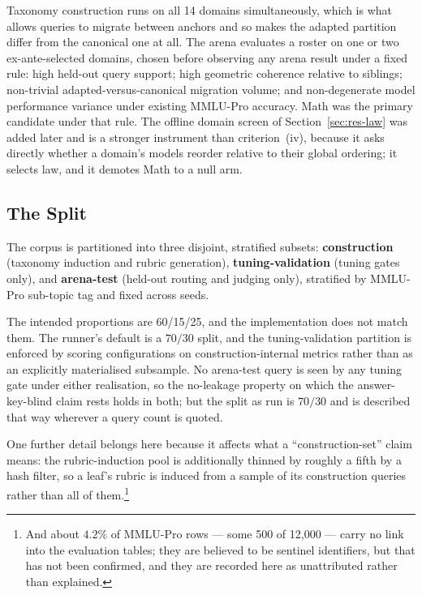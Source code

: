 Taxonomy construction runs on all 14 domains simultaneously, which is
what allows queries to migrate between anchors and so makes the adapted
partition differ from the canonical one at all.
The arena evaluates a roster on one or two ex-ante-selected domains,
chosen before observing any arena result under a fixed rule: high
held-out query support; high geometric coherence relative to siblings;
non-trivial adapted-versus-canonical migration volume; and
non-degenerate model performance variance under existing MMLU-Pro
accuracy. Math was the primary candidate under that rule. The offline
domain screen of Section~\ref{sec:res-law} was added later and is a
stronger instrument than criterion~(iv), because it asks directly
whether a domain's models reorder relative to their global ordering;
it selects law, and it demotes Math to a null arm.

\subsection{The Split}

The corpus is partitioned into three disjoint, stratified subsets:
\textbf{construction} (taxonomy induction and rubric generation),
\textbf{tuning-validation} (tuning gates only), and
\textbf{arena-test} (held-out routing and judging only), stratified by
MMLU-Pro sub-topic tag and fixed across seeds.

The intended proportions are 60/15/25, and the implementation does not
match them. The runner's default is a $70/30$ split, and the
tuning-validation partition is enforced by scoring configurations on
construction-internal metrics rather than as an explicitly materialised
subsample. No arena-test query is seen by any tuning gate under either
realisation, so the no-leakage property on which the answer-key-blind
claim rests holds in both; but the split as run is $70/30$ and is
described that way wherever a query count is quoted.

One further detail belongs here because it affects what a
``construction-set'' claim means: the rubric-induction pool is
additionally thinned by roughly a fifth by a hash filter, so a leaf's
rubric is induced from a sample of its construction queries rather than
all of them.\footnote{And about $4.2\%$ of MMLU-Pro rows --- some 500
of 12{,}000 --- carry no link into the evaluation tables; they are
believed to be sentinel identifiers, but that has not been confirmed,
and they are recorded here as unattributed rather than explained.}

